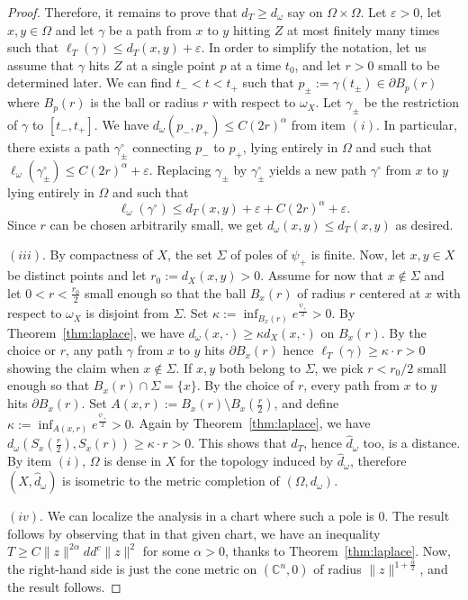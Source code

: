\documentclass[a4paper,11pt,leqno,english]{smfart}
\theoremstyle{plain}
\theoremstyle{plain}
\numberwithin{equation}{section} %
\numberwithin{figure}{section} %
\theoremstyle{plain}
\theoremstyle{plain}
\theoremstyle{remark}
\theoremstyle{remark}
\theoremstyle{definition}
\theoremstyle{plain}
\theoremstyle{plain}
\theoremstyle{definition}
\newcommand{\p}{\psi}
\newcommand{\ep}{\varepsilon}
\renewcommand{\ge}{\geq}
\renewcommand{\le}{\leq}
\begin{document}
\begin{proof}
Therefore, it remains to prove that $d_{T} \ge d_{\omega}$ say on $\Omega\times \Omega$.  Let $\ep>0$, let $x,y\in \Omega$ and let $\gamma$ be a path from $x$ to $y$ hitting $Z$ at most finitely many times such that $\ell_{T}(\gamma) \le d_{T}(x,y)+\ep$. In order to simplify the notation, let us assume that $\gamma$ hits $Z$ at a single point $p$ at a time $t_0$, and let $r>0$ small to be determined later. We can find $t_-<t<t_+$ such that $p_{\pm}:=\gamma(t_\pm)\in \partial B_p(r)$ where $B_p(r)$ is the ball or radius $r$ with respect to $\omega_X$. Let $\gamma_{\pm}$ be the restriction of $\gamma$ to $[t_-,t_+]$. We have $d_\omega(p_-, p_+)\le   C(2r)^\alpha$ from item $(i)$. In particular, there exists a path $\gamma_{\pm}^\circ$ connecting $p_-$ to $p_+$, lying entirely in $\Omega$ and such that $\ell_{\omega}(\gamma_{\pm}^\circ)\le  C(2r)^\alpha+\ep$. Replacing $\gamma_\pm$ by $\gamma_{\pm}^\circ$ yields a new path $\gamma^\circ$ from $x$ to $y$ lying entirely in $\Omega$ and such that 
  \[\ell_\omega(\gamma^\circ) \le d_{T}(x,y)+\ep+C(2r)^\alpha+\ep. \]
  Since $r$ can be chosen arbitrarily small, we get $d_\omega(x,y) \le d_{T}(x,y)$ as desired.

$(iii)$.  By compactness of $X$, the set $\Sigma$ of poles of $\p_+$ is finite. Now, let $x,y\in X$ be distinct points and let $r_0:=d_X(x,y)>0$. Assume for now that $x\notin \Sigma$ and let $0<r<\frac {r_0}2$ small enough so that the ball $B_x(r)$ of radius $r$ centered at $x$ with respect to $\omega_X$ is disjoint from $\Sigma$. Set $\kappa:=\inf_{B_{x}(r)} e^{\frac{\psi_+}{2}}>0$. By Theorem~\ref{thm:laplace}, we have $d_\omega(x,\cdot) \ge \kappa d_X(x,\cdot)$ on $B_x(r)$. By the choice or $r$, any path $\gamma$ from $x$ to $y$ hits $\partial B_x(r)$ hence $\ell_T(\gamma)\ge \kappa \cdot r>0$ showing the claim when $x\notin \Sigma$. If $x,y$ both belong to $\Sigma$, we pick $r <r_0/2$ small enough so that $B_x(r)\cap \Sigma=\{x\}$. By the choice of $r$, every path from $x$ to $y$ hits $\partial B_x(r)$. Set $A(x,r):=B_{x}(r)\setminus B_x(\frac r2)$, and define $\kappa:=\inf_{A(x,r)} e^{\frac{\psi_+}{2}}>0$. Again by Theorem~\ref{thm:laplace}, we have $d_\omega(S_x(\frac r2), S_x(r))\ge \kappa \cdot r >0$. This shows that $d_T$, hence $\hat d_{\omega}$ too, is a distance.  By item $(i)$, $\Omega$ is dense in $X$ for the topology induced by $\hat d_\omega$, therefore $(X,\hat d_\omega)$ is isometric to the metric completion of $(\Omega, d_\omega)$. 

$(iv)$. We can localize the analysis in a chart where such a pole is $0$. The result follows by observing that in that given chart, we have an inequality
$ T\ge C \|z\|^{2\alpha} dd^c \|z\|^2 $
   for some $\alpha >0$, thanks to Theorem~\ref{thm:laplace}. Now, the right-hand side is just the cone metric on $(\mathbb C^n,0)$ of radius $\|z\|^{1+\frac{\alpha}{2}}$, and the result follows. 
  \end{proof}
\end{document}
